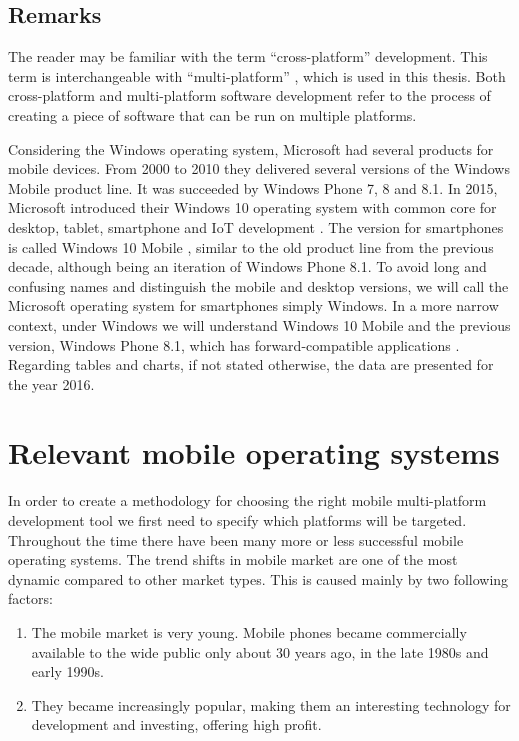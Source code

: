 \documentclass[english,master,public,dept460,male,cpdeclaration,oneside]{diploma}
\begin{document}
\subsection{Remarks}
The reader may be familiar with the term “cross-platform” development. This term is interchangeable with “multi-platform” \cite{wikiCrossPlatform}, which is used in this thesis. Both cross-platform and multi-platform software development refer to the process of creating a piece of software that can be run on multiple platforms.

Considering the Windows operating system, Microsoft had several products for mobile devices. From 2000 to 2010 they delivered several versions of the Windows Mobile product line. It was succeeded by Windows Phone 7, 8 and 8.1. In 2015, Microsoft introduced their Windows 10 operating system with common core for desktop, tablet, smartphone and IoT development \cite{windowsDevCenter}. The version for smartphones is called Windows 10 Mobile \cite{wikiWindowsMobile}, similar to the old product line from the previous decade, although being an iteration of Windows Phone 8.1. To avoid long and confusing names and distinguish the mobile and desktop versions, we will call the Microsoft operating system for smartphones simply Windows. In a more narrow context, under Windows we will understand Windows 10 Mobile and the previous version, Windows Phone 8.1, which has forward-compatible applications \cite{blogsWindows8to10}. 
Regarding tables and charts, if not stated otherwise, the data are presented for the year 2016.



\section{Relevant mobile operating systems}
In order to create a methodology for choosing the right mobile multi-platform development tool we first need to specify which platforms will be targeted. Throughout the time there have been many more or less successful mobile operating systems. The trend shifts in mobile market are one of the most dynamic compared to other market types. This is caused mainly by two following factors:
\begin{enumerate}
	\item The mobile market is very young. Mobile phones became commercially available to the wide public only about 30 years ago, in the late 1980s and early 1990s. 
	\item They became increasingly popular, making them an interesting technology for development and investing, offering high profit. 
\end{enumerate}
\end{document}
